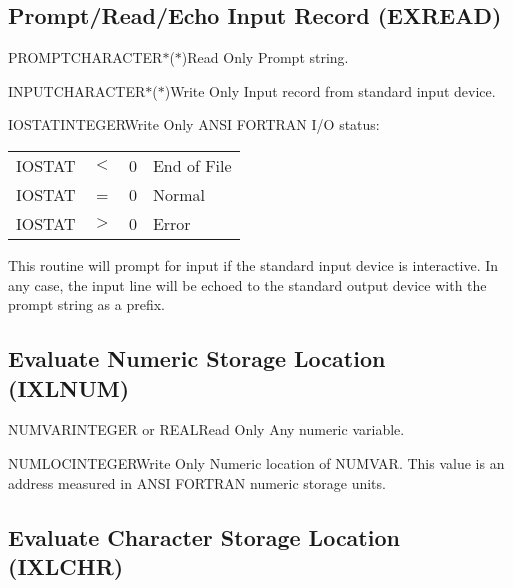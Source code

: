 \subsection{Prompt/Read/Echo Input Record (EXREAD)} \label{sec:exread}


\begin{argy}{PROMPT}{CHARACTER$*$($*$)}{Read Only}
Prompt string.
\end{argy}

\begin{argy}{INPUT}{CHARACTER$*$($*$)}{Write Only}
Input record from standard input device.
\end{argy}

\begin{argy}{IOSTAT}{INTEGER}{Write Only}
ANSI FORTRAN I/O status:\\
\begin{tabular}{cccl}
IOSTAT &$<$ & 0 & End of File\\
IOSTAT &=   & 0 & Normal\\
IOSTAT &$>$ & 0 & Error\\
\end{tabular}
\end{argy}

This routine will prompt for input if the standard input device is
interactive.  In any case, the input line will be echoed to the standard
output device with the prompt string as a prefix.


\subsection{Evaluate Numeric Storage Location (IXLNUM)}


\begin{argy}{NUMVAR}{INTEGER or REAL}{Read Only}
Any numeric variable.
\end{argy}

\begin{argy}{NUMLOC}{INTEGER}{Write Only}
Numeric location of NUMVAR.  This value is an address measured in ANSI
FORTRAN numeric storage units.
\end{argy}


\subsection{Evaluate Character Storage Location (IXLCHR)}

